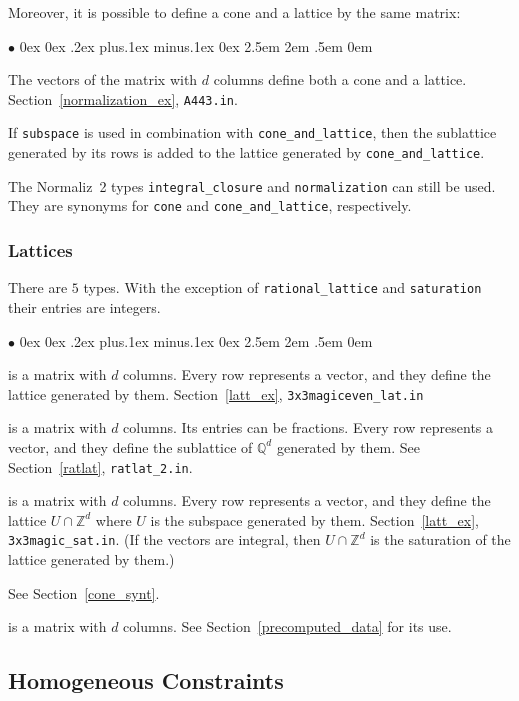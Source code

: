 \documentclass[12pt,a4paper]{scrartcl}
\newcommand{\stdli}{ \topsep0ex \partopsep0ex %
\parsep.2ex plus.1ex minus.1ex \itemsep0ex%
\leftmargin2.5em \labelwidth2em \labelsep.5em \rightmargin0em}%
\renewenvironment{itemize}{\begin{list}{{$\bullet$}}{\stdli}}{\end{list}}
\theoremstyle{definition}
\def\ZZ{{\mathbb Z}}
\def\QQ{{\mathbb Q}}
\def\itemtt[#1]{\item[\textbf{\ttt{#1}}]}
\def\ttt{\texttt}
\begin{document}
Moreover, it is possible to define a cone and a lattice by the same matrix:

\begin{itemize}
	\itemtt[cone\_and\_lattice] The vectors of the matrix with $d$ columns define both a cone and a lattice. Section~\ref{normalization_ex}, \verb|A443.in|.
	
	If \verb|subspace| is used in combination with \verb|cone_and_lattice|, then the sublattice generated by its rows is added to the lattice generated by \verb|cone_and_lattice|.
\end{itemize}


The Normaliz~2 types \verb|integral_closure| and \verb|normalization| can still be used. They are synonyms for \verb|cone| and \verb|cone_and_lattice|, respectively.

\subsubsection{Lattices}

There are $5$ types. With the exception of \ttt{rational\_lattice} and \ttt{saturation} their entries are integers.

\begin{itemize}
	\itemtt[lattice] is a matrix with $d$ columns. Every row represents a vector, and they define the lattice generated by them. Section~\ref{latt_ex}, \verb|3x3magiceven_lat.in|
	
	\itemtt[rational\_lattice] is a matrix with $d$ columns. Its entries can be fractions. Every row represents a vector, and they define the sublattice of $\QQ^d$ generated by them. See Section~\ref{ratlat}, \verb|ratlat_2.in|.
	
	\itemtt[saturation] is a matrix with $d$ columns. Every row represents a vector, and they define the lattice $U\cap \ZZ^d$ where $U$ is the subspace generated by them. Section~\ref{latt_ex}, \verb|3x3magic_sat.in|. (If the vectors are integral, then $U\cap \ZZ^d$ is the saturation of the lattice generated by them.)
	
	\itemtt[cone\_and\_lattice] See Section~\ref{cone_synt}.
	
	\itemtt[generated\_lattice] is a matrix with $d$ columns. See Section~\ref{precomputed_data} for its use.
\end{itemize}


\subsection{Homogeneous Constraints}
\end{document}
